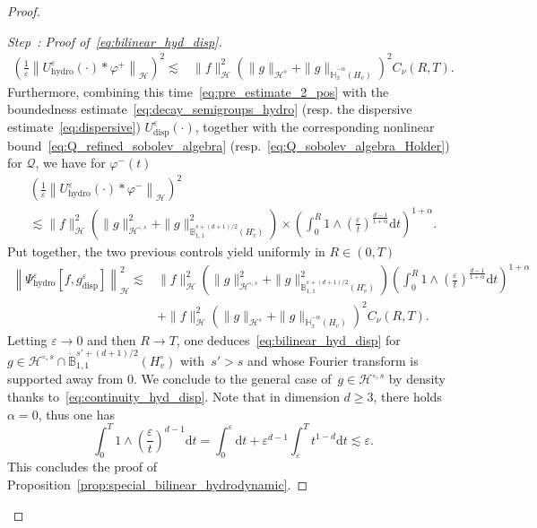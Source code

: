 \documentclass[AHL,Unicode,longabstracts,published]{cedram}
\newcommand{\hyd}{\mathrm{hydro}}
\renewcommand{\d}{\mathrm{d}}
\newcommand{\disp}{\mathrm{disp}}
\newcommand{\bbH}{\mathbb{H}}
\newcommand{\bbB}{\mathbb{B}}
\newcommand{\HH}{\mathcal{H}}
\newcommand{\QQ}{\mathcal{Q}}
\newcommand{\HHH}{\mathscr{H}}
\newcommand{\Ss}{H}
\newcommand{\Ssm}{H^{\circ}}
\newcommand{\rSSs}[1]{\HH^{#1}}
\newcommand{\rSSsm}[1]{\HH^{{\circ}, #1}}
\newcommand{\SSSs}{\HHH}
\renewcommand*\ge{\geqslant}
\newcommand*\eps{{\varepsilon}}
\newcounter{stepcount}
\newenvironment{step}[1]{\refstepcounter{stepcount}\begin{proof}[Step~\thestepcount: #1]}{\let\qed\relax\end{proof}}
\begin{document}
\begin{proof}
\begin{step}{{Proof of~\eqref{eq:bilinear_hyd_disp}}}
\begin{align*}
\left(\frac{1}{\eps} \left\| U^\eps_\hyd(\cdot) * \varphi^+ \right\|_\SSSs\right)^2 \lesssim &
\| f \|_{ \SSSs}^2 \left(\| g \|_{ \rSSs{s} } + \| g \|_{ \dot{\bbH}^{-\alpha}_x \left(\Ss_v \right) } \right)^2 C_\nu(R, T).
\end{align*}
Furthermore, combining this time~\eqref{eq:pre_estimate_2_pos} with the boundedness estimate~\eqref{eq:decay_semigroups_hydro} (resp. the dispersive estimate~\eqref{eq:dispersive}) $U^\eps_\disp(\cdot)$, together with the corresponding nonlinear bound~\eqref{eq:Q_refined_sobolev_algebra} (resp.~\eqref{eq:Q_sobolev_algebra_Holder}) for $\QQ$, we have for $\varphi^-(t)$
\begin{multline}\label{eq:continuity_hyd_disp_vanish}
\left(\frac{1}{\eps} \left\| U^\eps_\hyd(\cdot) * \varphi^-\right\|_\SSSs \right)^2
\\
\lesssim \| f \|_{\SSSs}^2 \left(\| g \|_{ \rSSsm{s} }^2 + \| g \|_{ \dot{\bbB}^{s + (d+1)/2 }_{1, 1} \left(\Ssm_v \right) }^2 \right)
\times \left(\int_0^R 1 \land \left(\frac{\eps}{t}\right)^{\frac{d-1}{1+\alpha}} \d t\right)^{1+\alpha}.
\end{multline}
Put together, the two previous controls yield uniformly in $R \in (0, T)$
\begin{align*}
\left\| \Psi^\eps_\hyd\left[f, g^\eps_\disp\right] \right\|_\SSSs^2 \lesssim &
\| f \|_{\SSSs}^2 \left(\| g \|_{ \rSSsm{s} }^2 + \| g \|_{ \dot{\bbB}^{s + (d+1)/2 }_{1, 1} \left(\Ssm_v \right) }^2 \right) \left(\int_0^{R} 1 \land \left(\frac{\eps}{t}\right)^{\frac{d-1}{1+\alpha}} \d t\right)^{1+\alpha} \\
& + \| f \|_{ \SSSs}^2 \left(\| g \|_{ \rSSs{s} } + \| g \|_{ \dot{\bbH}^{-\alpha}_x \left(\Ss_v \right) } \right)^2 C_\nu(R, T).
\end{align*}
Letting $\eps \to 0$ and then $R \to T$, one deduces~\eqref{eq:bilinear_hyd_disp} for $g \in \rSSsm{s} \cap \dot{\bbB}^{s' + (d+1)/2 }_{1, 1} (\Ssm_v)$ with~$s' > s$ and whose Fourier transform is supported away from $0$. We conclude to the general case of~$g \in \rSSsm{s}$ by density thanks to~\eqref{eq:continuity_hyd_disp}. Note that in dimension $d \ge 3$, there holds $\alpha = 0$, thus one has
\[
\int_0^T 1 \land \left(\frac{\eps}{t}\right)^{d-1} \d t =\int_0^\eps \d t+ \eps^{d-1}\int_{\eps}^T t^{1-d}\d t \lesssim \eps.
\]
This concludes the proof of Proposition~\ref{prop:special_bilinear_hydrodynamic}.\qedhere
\end{step}\let\qed\relax
\end{proof}
\end{document}
